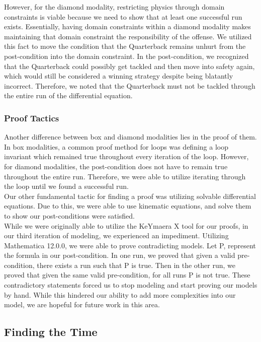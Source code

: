 However, for the diamond modality, restricting physics through domain constraints is viable because we need to show that at least one successful run exists. Essentially, having domain constraints within a diamond modality makes maintaining that domain constraint the responsibility of the offense. We utilized this fact to move the condition that the Quarterback remains unhurt from the post-condition into the domain constraint. In the post-condition, we recognized that the Quarterback could possibly get tackled and then move into safety again, which would still be considered a winning strategy despite being blatantly incorrect. Therefore, we noted that the Quarterback must not be tackled through the entire run of the differential equation.

\subsubsection{Proof Tactics}
\quad Another difference between box and diamond modalities lies in the proof of them. In box modalities, a common proof method for loops was defining a loop invariant which remained true throughout every iteration of the loop. However, for diamond modalities, the post-condition does not have to remain true throughout the entire run. Therefore, we were able to utilize iterating through the loop until we found a successful run. \\

Our other fundamental tactic for finding a proof was utilizing solvable differential equations. Due to this, we were able to use kinematic equations, and solve them to show our post-conditions were satisfied. \\

While we were originally able to utilize the KeYmaera X tool for our proofs, in our third iteration of modeling, we experienced an impediment. Utilizing Mathematica 12.0.0, we were able to prove contradicting models. Let P, represent the formula in our post-condition. In one run, we proved that given a valid pre-condition, there exists a run such that P is true. Then in the other run, we proved that given the same valid pre-condition, for all runs P is not true. These contradictory statements forced us to stop modeling and start proving our models by hand. While this hindered our ability to add more complexities into our model, we are hopeful for future work in this area. 

\subsection{Finding the Time}


